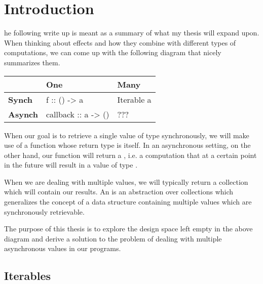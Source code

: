 %
%
\let\textcircled=\pgftextcircled
\chapter{Introduction}
\label{chap:intro}


he following write up is meant as a summary of what my thesis will expand upon. When thinking about effects and how they combine with different types of computations, we can come up with the following diagram that nicely summarizes them.

\begin{center}
    \begin{tabular}{| l | l | l |}
    \hline
    & \textbf{One} & \textbf{Many} \\ 
    \hline
	\textbf{Synch} & f :: () -> a & Iterable a \\ 
	\hline
	\textbf{Asynch} & callback :: a -> () & ??? \\ 
	\hline
    \end{tabular}
\end{center}


When our goal is to retrieve a single value of type  synchronously, we will make use of a function whose return type is  itself. In an asynchronous setting, on the other hand, our function will return a , i.e. a computation that at a certain point in the future will result in a value of type .

When we are dealing with multiple values, we will typically return a collection which will contain our results. An  is an abstraction over collections which generalizes the concept of a data structure containing multiple values which are synchronously retrievable.

The purpose of this thesis is to explore the design space left empty in the above diagram and derive a solution to the problem of dealing with multiple asynchronous values in our programs.

\section{Iterables}
\label{sec:sec01}


